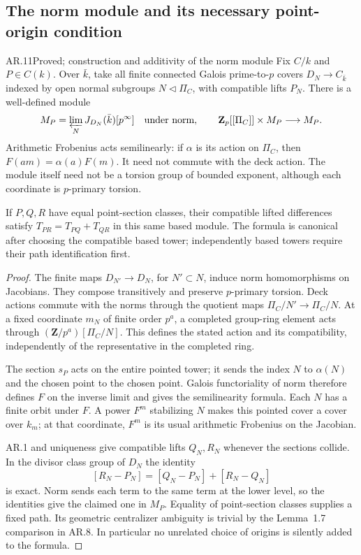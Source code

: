 \subsection{The norm module and its necessary point-origin condition}

\begin{claim}{AR.11}{Proved; construction and additivity of the norm module}
Fix $C/k$ and $P\in C(k)$.  Over $\bar k$, take all finite connected
Galois prime-to-$p$ covers $D_N\to C_{\bar k}$ indexed by open normal
subgroups $N\triangleleft\Pi_C$, with compatible lifts $P_N$.
There is a well-defined module
\[
 M_P=\varprojlim_N J_{D_N}(\bar k)[p^\infty]
                \quad\text{under norm},
 \qquad \mathbf Z_p[[\Pi_C]]\times M_P\longrightarrow M_P.
\]
Arithmetic Frobenius acts semilinearly: if $\alpha$ is its action on
$\Pi_C$, then $F(am)=\alpha(a)F(m)$.  It need not commute with the
deck action.  The module itself need not be a torsion group of bounded
exponent, although each coordinate is $p$-primary torsion.

If $P,Q,R$ have equal point-section classes, their compatible lifted
differences satisfy $T_{PR}=T_{PQ}+T_{QR}$ in this same based module.
The formula is canonical after choosing the compatible based tower;
independently based towers require their path identification first.
\end{claim}
\begin{proof}
The finite maps $D_{N'}\to D_N$, for $N'\subset N$, induce norm
homomorphisms on Jacobians.  They compose transitively and preserve
$p$-primary torsion.  Deck actions commute with the norms through the
quotient maps $\Pi_C/N'\to\Pi_C/N$.  At a fixed coordinate $m_N$
of finite order $p^a$, a completed group-ring element acts through
$(\mathbf Z/p^a)[\Pi_C/N]$.  This defines the stated action and its
compatibility, independently of the representative in the completed
ring.

The section $s_P$ acts on the entire pointed tower; it sends the
index $N$ to $\alpha(N)$ and the chosen point to the chosen point.
Galois functoriality of norm therefore defines $F$ on the inverse
limit and gives the semilinearity formula.  Each $N$ has a finite
orbit under $F$.  A power $F^m$ stabilizing $N$ makes this pointed
cover a cover over $k_m$; at that coordinate, $F^m$ is its usual
arithmetic Frobenius on the Jacobian.

AR.1 and uniqueness give compatible lifts $Q_N,R_N$ whenever the
sections collide.  In the divisor class group of $D_N$ the identity
\[
 [R_N-P_N]=[Q_N-P_N]+[R_N-Q_N]
\]
is exact.  Norm sends each term to the same term at the lower level,
so the identities give the claimed one in $M_P$.  Equality of
point-section classes supplies a fixed path.  Its geometric
centralizer ambiguity is trivial by the Lemma~1.7 comparison in
AR.8.  In particular no unrelated choice of origins is silently
added to the formula.
\end{proof}

